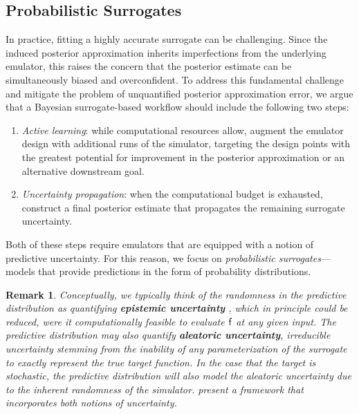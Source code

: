 \documentclass[12pt]{article}
\newtheorem{remark}{Remark}
\begin{document}
\subsection{Probabilistic Surrogates}
In practice, fitting a highly accurate surrogate can be challenging. Since the induced posterior approximation
inherits imperfections from the underlying emulator, this raises the concern that the posterior estimate 
can be simultaneously biased and overconfident. To address this fundamental challenge and mitigate the problem 
of unquantified posterior approximation error, we argue that a Bayesian surrogate-based workflow should include
the following two steps:
\begin{enumerate}
\item \textit{Active learning}: while computational resources allow, augment the emulator design with additional 
runs of the simulator, targeting the design points with the greatest potential for improvement in the posterior
approximation or an alternative downstream goal.
\item \textit{Uncertainty propagation}: when the computational budget is exhausted, 
construct a final posterior estimate that propagates the remaining surrogate uncertainty. 
\end{enumerate}
Both of these steps require emulators that are equipped with a notion of predictive uncertainty. For this reason, 
we focus on \textit{probabilistic surrogates}---models that provide predictions in the form of probability
distributions.

\begin{remark}
Conceptually, we typically think of the randomness in the predictive distribution as quantifying \textbf{epistemic uncertainty} \citep{epistemicAleatoric}, which in principle could be reduced, were it computationally feasible to evaluate 
$\mathsf{f}$ at any given input. The predictive distribution may also quantify \textbf{aleatoric uncertainty}, 
irreducible uncertainty stemming from the inability of any parameterization of the surrogate to exactly 
represent the true target function. In the case that the target is stochastic, the predictive distribution will
also model the aleatoric uncertainty due to the inherent randomness of the simulator.
\citet{BurknerSurrogate} present a framework that incorporates both notions of uncertainty.
\end{remark}
\end{document}
